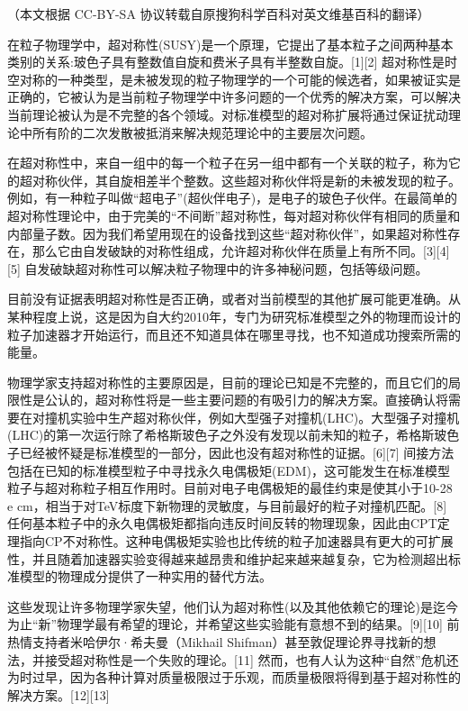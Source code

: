 
（本文根据 CC-BY-SA 协议转载自原搜狗科学百科对英文维基百科的翻译）

在粒子物理学中，超对称性(SUSY)是一个原理，它提出了基本粒子之间两种基本类别的关系:玻色子具有整数值自旋和费米子具有半整数自旋。[1][2] 超对称性是时空对称的一种类型，是未被发现的粒子物理学的一个可能的候选者，如果被证实是正确的，它被认为是当前粒子物理学中许多问题的一个优秀的解决方案，可以解决当前理论被认为是不完整的各个领域。对标准模型的超对称扩展将通过保证扰动理论中所有阶的二次发散被抵消来解决规范理论中的主要层次问题。

在超对称性中，来自一组中的每一个粒子在另一组中都有一个关联的粒子，称为它的超对称伙伴，其自旋相差半个整数。这些超对称伙伴将是新的未被发现的粒子。例如，有一种粒子叫做“超电子”(超伙伴电子)，是电子的玻色子伙伴。在最简单的超对称性理论中，由于完美的“不间断”超对称性，每对超对称伙伴有相同的质量和内部量子数。因为我们希望用现在的设备找到这些“超对称伙伴”，如果超对称性存在，那么它由自发破缺的对称性组成，允许超对称伙伴在质量上有所不同。[3][4][5] 自发破缺超对称性可以解决粒子物理中的许多神秘问题，包括等级问题。

目前没有证据表明超对称性是否正确，或者对当前模型的其他扩展可能更准确。从某种程度上说，这是因为自大约2010年，专门为研究标准模型之外的物理而设计的粒子加速器才开始运行，而且还不知道具体在哪里寻找，也不知道成功搜索所需的能量。

物理学家支持超对称性的主要原因是，目前的理论已知是不完整的，而且它们的局限性是公认的，超对称性将是一些主要问题的有吸引力的解决方案。直接确认将需要在对撞机实验中生产超对称伙伴，例如大型强子对撞机(LHC)。大型强子对撞机(LHC)的第一次运行除了希格斯玻色子之外没有发现以前未知的粒子，希格斯玻色子已经被怀疑是标准模型的一部分，因此也没有超对称性的证据。[6][7] 间接方法包括在已知的标准模型粒子中寻找永久电偶极矩(EDM)，这可能发生在标准模型粒子与超对称粒子相互作用时。目前对电子电偶极矩的最佳约束是使其小于10-28 e cm，相当于对TeV标度下新物理的灵敏度，与目前最好的粒子对撞机匹配。[8] 任何基本粒子中的永久电偶极矩都指向违反时间反转的物理现象，因此由CPT定理指向CP不对称性。这种电偶极矩实验也比传统的粒子加速器具有更大的可扩展性，并且随着加速器实验变得越来越昂贵和维护起来越来越复杂，它为检测超出标准模型的物理成分提供了一种实用的替代方法。

这些发现让许多物理学家失望，他们认为超对称性(以及其他依赖它的理论)是迄今为止“新”物理学最有希望的理论，并希望这些实验能有意想不到的结果。[9][10] 前热情支持者米哈伊尔·希夫曼（Mikhail Shifman）甚至敦促理论界寻找新的想法，并接受超对称性是一个失败的理论。[11] 然而，也有人认为这种“自然”危机还为时过早，因为各种计算对质量极限过于乐观，而质量极限将得到基于超对称性的解决方案。[12][13]

